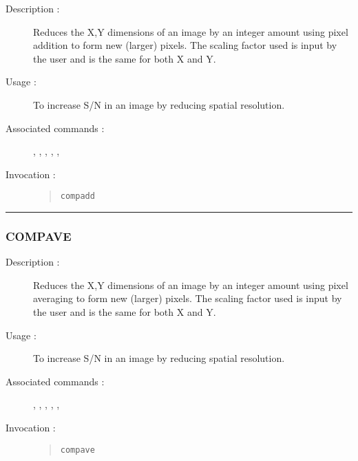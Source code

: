 \begin{description}

\item[Description :] Reduces the X,Y dimensions of an image by an
integer amount using pixel addition to form new (larger) pixels.  The
scaling factor used is input by the user and is the same for both X and
Y.

\item[Usage :] To increase S/N in an image by reducing spatial resolution.

\item[Associated commands :] {\tt {}},
{\tt {}}, {\tt {}},
{\tt {}}, {\tt {}},
{\tt {}}

\item[Invocation :]

\begin{quote}{\tt  compadd }\end{quote}

\end{description}

\hrule
\subsubsection*{\label{COMPAVE}COMPAVE}

\begin{description}

\item[Description :] Reduces the X,Y dimensions of an image by an
integer amount using pixel averaging to form new (larger) pixels.  The
scaling factor used is input by the user and is the same for both X and
Y.

\item[Usage :] To increase S/N in an image by reducing spatial resolution.

\item[Associated commands :] {\tt {}},
{\tt {}}, {\tt {}},
{\tt {}}, {\tt {}},
{\tt {}}

\item[Invocation :]

\begin{quote}{\tt  compave }\end{quote}

\end{description}

